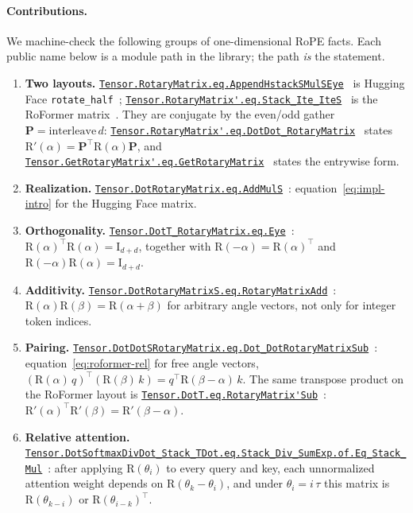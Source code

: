 \documentclass[11pt,a4paper]{article}
\newcommand{\lmod}[1]{\href{http://www.lemma.cn/lean/?module=#1}{\nolinkurl{#1}}}
\newcommand{\rot}{\mathrm{R}}
\newcommand{\eye}{\mathrm{I}}
\begin{document}
\paragraph{Contributions.}
We machine-check the following groups of one-dimensional RoPE facts.
Each public name below is a module path in the library; the path \emph{is} the statement.

\begin{enumerate}[leftmargin=1.6em,itemsep=0.4em]
  \item \textbf{Two layouts.}
    \lmod{Tensor.RotaryMatrix.eq.AppendHstackSMulSEye}~\cite{lemma_rope_hf_def}
    is Hugging Face \texttt{rotate\_half}~\cite{huggingface_rope_utils};
    \lmod{Tensor.RotaryMatrix'.eq.Stack_Ite_IteS}~\cite{lemma_rope_su_def}
    is the RoFormer matrix~\cite{su2021roformer}.
    They are conjugate by the even/odd gather \(\boldsymbol{P}=\mathrm{interleave}\,d\):
    \lmod{Tensor.RotaryMatrix'.eq.DotDot_RotaryMatrix}~\cite{lemma_rope_conj}
    states \(\rot'(\alpha)=\boldsymbol{P}^\top\rot(\alpha)\boldsymbol{P}\),
    and
    \lmod{Tensor.GetRotaryMatrix'.eq.GetRotaryMatrix}~\cite{lemma_rope_entry}
    states the entrywise form.
  \item \textbf{Realization.}
    \lmod{Tensor.DotRotaryMatrix.eq.AddMulS}~\cite{lemma_rope_real}:
    equation~\eqref{eq:impl-intro} for the Hugging Face matrix.
  \item \textbf{Orthogonality.}
    \lmod{Tensor.DotT_RotaryMatrix.eq.Eye}~\cite{lemma_rope_orth}:
    \(\rot(\alpha)^\top\rot(\alpha)=\eye_{d+d}\),
    together with \(\rot(-\alpha)=\rot(\alpha)^\top\) and \(\rot(-\alpha)\rot(\alpha)=\eye_{d+d}\).
  \item \textbf{Additivity.}
    \lmod{Tensor.DotRotaryMatrixS.eq.RotaryMatrixAdd}~\cite{lemma_rope_add}:
    \(\rot(\alpha)\rot(\beta)=\rot(\alpha+\beta)\)
    for arbitrary angle vectors, not only for integer token indices.
  \item \textbf{Pairing.}
    \lmod{Tensor.DotDotSRotaryMatrix.eq.Dot_DotRotaryMatrixSub}~\cite{lemma_rope_pair}:
    equation~\eqref{eq:roformer-rel} for free angle vectors,
    \((\rot(\alpha)\,q)^\top(\rot(\beta)\,k)=q^\top\rot(\beta-\alpha)\,k\).
    The same transpose product on the RoFormer layout is
    \lmod{Tensor.DotT.eq.RotaryMatrix'Sub}~\cite{lemma_rope_su_sub}:
    \(\rot'(\alpha)^\top\rot'(\beta)=\rot'(\beta-\alpha)\).
  \item \textbf{Relative attention.}
    \lmod{Tensor.DotSoftmaxDivDot_Stack_TDot.eq.Stack_Div_SumExp.of.Eq_Stack_Mul}~\cite{lemma_rope_rel}:
    after applying \(\rot(\theta_i)\) to every query and key,
    each unnormalized attention weight depends on \(\rot(\theta_k-\theta_i)\),
    and under \(\theta_i=i\,\tau\) this matrix is
    \(\rot(\theta_{k-i})\) or \(\rot(\theta_{i-k})^\top\).
\end{enumerate}
\end{document}
